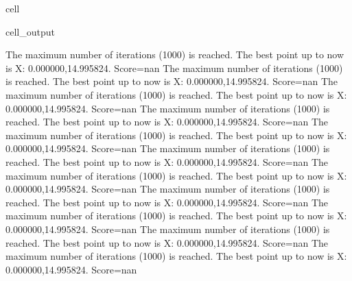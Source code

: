 \documentclass[letterpaper,10pt,english]{jupyterBook}
\begin{document}
\begin{sphinxuseclass}{cell}
\begin{sphinxVerbatimOutput}
\begin{sphinxuseclass}{cell_output}
\begin{sphinxVerbatim}[commandchars=\\\{\}]
The maximum number of iterations (1000) is reached. The best point up to now is X: \PYGZob{}0.000000,14.995824\PYGZcb{}. Score=\PYGZhy{}nan
The maximum number of iterations (1000) is reached. The best point up to now is X: \PYGZob{}0.000000,14.995824\PYGZcb{}. Score=\PYGZhy{}nan
The maximum number of iterations (1000) is reached. The best point up to now is X: \PYGZob{}0.000000,14.995824\PYGZcb{}. Score=\PYGZhy{}nan
The maximum number of iterations (1000) is reached. The best point up to now is X: \PYGZob{}0.000000,14.995824\PYGZcb{}. Score=\PYGZhy{}nan
The maximum number of iterations (1000) is reached. The best point up to now is X: \PYGZob{}0.000000,14.995824\PYGZcb{}. Score=\PYGZhy{}nan
The maximum number of iterations (1000) is reached. The best point up to now is X: \PYGZob{}0.000000,14.995824\PYGZcb{}. Score=\PYGZhy{}nan
The maximum number of iterations (1000) is reached. The best point up to now is X: \PYGZob{}0.000000,14.995824\PYGZcb{}. Score=\PYGZhy{}nan
The maximum number of iterations (1000) is reached. The best point up to now is X: \PYGZob{}0.000000,14.995824\PYGZcb{}. Score=\PYGZhy{}nan
The maximum number of iterations (1000) is reached. The best point up to now is X: \PYGZob{}0.000000,14.995824\PYGZcb{}. Score=\PYGZhy{}nan
The maximum number of iterations (1000) is reached. The best point up to now is X: \PYGZob{}0.000000,14.995824\PYGZcb{}. Score=\PYGZhy{}nan
The maximum number of iterations (1000) is reached. The best point up to now is X: \PYGZob{}0.000000,14.995824\PYGZcb{}. Score=\PYGZhy{}nan
\end{sphinxVerbatim}


\end{sphinxuseclass}
\end{sphinxVerbatimOutput}
\end{sphinxuseclass}
\end{document}
